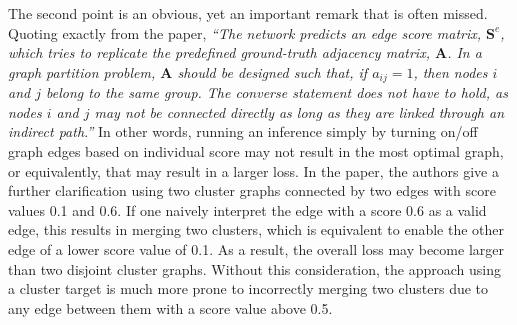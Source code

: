 \documentclass{ws-rv9x6}
\begin{document}
The second point is an obvious, yet an important remark that is often missed. Quoting exactly from the paper, {\it ``The network predicts an edge score matrix, $\bm{S}^e$, which tries to replicate the predefined ground-truth adjacency matrix, $\bm{A}$. In a graph partition problem, $\bm{A}$ should be designed such that, if $a_{ij}=1$, then nodes $i$ and $j$ belong to the same group. The converse statement does not have to hold, as nodes $i$ and $j$ may not be connected directly as long as they are linked through an indirect path.''} In other words, running an inference simply by turning on/off graph edges based on individual score may not result in the most optimal graph, or equivalently, that may result in a larger loss. In the paper, the authors give a further clarification using two cluster graphs connected by two edges with score values 0.1 and 0.6. If one naively interpret the edge with a score 0.6 as a valid edge, this results in merging two clusters, which is equivalent to enable the other edge of a lower score value of 0.1. As a result, the overall loss may become larger than two disjoint cluster graphs. Without this consideration, the approach using a cluster target is much more prone to incorrectly merging two clusters due to any edge between them with a score value above 0.5. 
\end{document}
